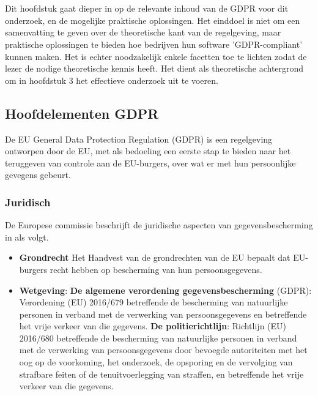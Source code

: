 \chapter{}
\label{ch:stand-van-zaken}



Dit hoofdstuk gaat dieper in op de relevante inhoud van de GDPR voor dit onderzoek, en de mogelijke praktische oplossingen. 
Het einddoel is niet om een samenvatting te geven over de theoretische kant van de regelgeving, maar praktische oplossingen te bieden hoe bedrijven hun software 'GDPR-compliant' kunnen maken. 
Het is echter noodzakelijk enkele facetten toe te lichten zodat de lezer de nodige theoretische kennis heeft.
 Het dient als theoretische achtergrond om in hoofdstuk 3 het effectieve onderzoek uit te voeren.
 
 
\section{{Hoofdelementen GDPR}}

De EU General Data Protection Regulation (GDPR) is een regelgeving ontworpen door de EU, met als bedoeling een eerste stap te bieden naar het teruggeven van controle aan de EU-burgers, over wat er met hun persoonlijke gevegens gebeurt. 

\subsection{Juridisch}
De Europese commissie beschrijft de juridische aspecten van gegevensbescherming in \autocite{Eucom2018} als volgt.

\begin{itemize}
    \item \textbf{Grondrecht} Het Handvest van de grondrechten van de EU bepaalt dat EU-burgers recht hebben op bescherming van hun persoonsgegevens.
    \item \textbf{Wetgeving}: 
    \subitem \textbf{De algemene verordening gegevensbescherming} (GDPR): 
    Verordening (EU) 2016/679 betreffende de bescherming van natuurlijke personen in verband met de verwerking van persoonsgegevens en betreffende het vrije verkeer van die gegevens.
    \subitem \textbf{De politierichtlijn}: 
    Richtlijn (EU) 2016/680 betreffende de bescherming van natuurlijke personen in verband met de verwerking van persoonsgegevens door bevoegde autoriteiten met het oog op de voorkoming, het onderzoek, de opsporing en de vervolging van strafbare feiten of de tenuitvoerlegging van straffen, en betreffende het vrije verkeer van die gegevens.
   
\end{itemize}


